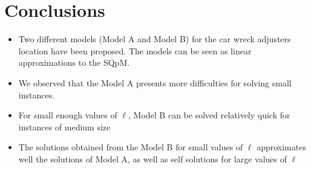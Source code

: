 
\section{Conclusions}
\begin{frame}
  
  \begin{itemize}
  \item Two different models (Model A and Model B) for the car wreck adjusters location have been proposed. 
    The models can be seen as linear approximations to the SQpM.
  \item We observed that the Model A presents more difficulties for solving small instances.
  \item For small enough values of $\ell$, Model B can be solved relatively quick
    for instances of medium size
  \item The solutions obtained from the Model B for small values of $\ell$
    approximates well the solutions of Model A,
    as well as self solutions for large values of $\ell$
  \end{itemize}

\end{frame}
